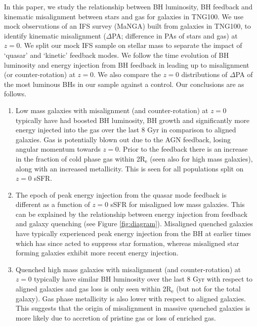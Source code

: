 \documentclass[fleqn,usenatbib]{mnras}
\begin{document}
In this paper, we study the relationship between BH luminosity, BH feedback and kinematic misalignment between stars and gas for galaxies in TNG100. We use mock observations of an IFS survey (MaNGA) built from galaxies in TNG100, to identify kinematic misalignment ($\Delta$PA; difference in PAs of stars and gas) at $z=0$. We split our mock IFS sample on stellar mass to separate the impact of `quasar' and `kinetic' feedback modes. We follow the time evolution of BH luminosity and energy injection from BH feedback in leading up to misalignment (or counter-rotation) at $z=0$. We also compare the $z=0$ distributions of $\Delta$PA of the most luminous BHs in our sample against a control. Our conclusions are as follows.
\begin{enumerate}
    \item Low mass galaxies with misalignment (and counter-rotation) at $z=0$ typically have had boosted BH luminosity, BH growth and significantly more energy injected into the gas over the last 8 Gyr in comparison to aligned galaxies. Gas is potentially blown out due to the AGN feedback, losing angular momentum towards $z=0$. Prior to the feedback there is an increase in the fraction of cold phase gas within 2$\mathrm{R_{e}}$ (seen also for high mass galaxies), along with an increased metallicity. This is seen for all populations split on $z=0$ sSFR.
    
    \item The epoch of peak energy injection from the quasar mode feedback is different as a function of $z=0$ sSFR for misaligned low mass galaxies. This can be explained by the relationship between energy injection from feedback and galaxy quenching (see Figure \ref{fig:diagram}). Misaligned quenched galaxies have typically experienced peak energy injection from the BH at earlier times which has since acted to suppress star formation, whereas misaligned star forming galaxies exhibit more recent energy injection. 

    \item Quenched high mass galaxies with misalignment (and counter-rotation) at $z=0$ typically have similar BH luminosity over the last 8 Gyr with respect to aligned galaxies and gas loss is only seen within 2$\mathrm{R_{e}}$ (but not for the total galaxy). Gas phase metallicity is also lower with respect to aligned galaxies. This suggests that the origin of misalignment in massive quenched galaxies is more likely due to accretion of pristine gas or loss of enriched gas. 
    

\end{enumerate}
\end{document}
